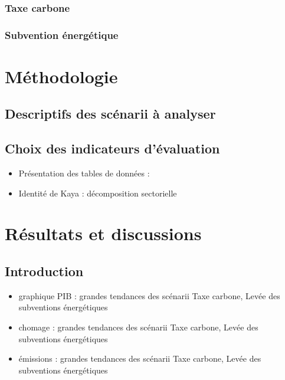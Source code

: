 \documentclass[
]{article}
\providecommand{\tightlist}{%
  \setlength{\itemsep}{0pt}\setlength{\parskip}{0pt}}
\begin{document}
\hypertarget{taxe-carbone}{%
\subsubsection{Taxe carbone}\label{taxe-carbone}}

\hypertarget{subvention-uxe9nerguxe9tique}{%
\subsubsection{Subvention
énergétique}\label{subvention-uxe9nerguxe9tique}}

\hypertarget{muxe9thodologie}{%
\section{Méthodologie}\label{muxe9thodologie}}

\hypertarget{descriptifs-des-scuxe9narii-uxe0-analyser}{%
\subsection{Descriptifs des scénarii à
analyser}\label{descriptifs-des-scuxe9narii-uxe0-analyser}}

\hypertarget{choix-des-indicateurs-duxe9valuation}{%
\subsection{Choix des indicateurs
d'évaluation}\label{choix-des-indicateurs-duxe9valuation}}

\begin{itemize}
\item
  Présentation des tables de données :
\item
  Identité de Kaya : décomposition sectorielle
\end{itemize}

\hypertarget{ruxe9sultats-et-discussions}{%
\section{Résultats et discussions}\label{ruxe9sultats-et-discussions}}

\hypertarget{introduction-1}{%
\subsection{Introduction}\label{introduction-1}}

\begin{itemize}
\tightlist
\item
  graphique PIB : grandes tendances des scénarii Taxe carbone, Levée des
  subventions énergétiques
\item
  chomage : grandes tendances des scénarii Taxe carbone, Levée des
  subventions énergétiques
\item
  émissions : grandes tendances des scénarii Taxe carbone, Levée des
  subventions énergétiques
\end{itemize}
\end{document}
